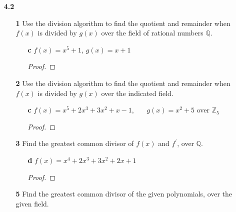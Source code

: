 \documentclass[paper=usletter, fontsize=12pt]{article}
\begin{document}

    \begin{enumerate}

        \item[\textbf{4.2}]
        \begin{enumerate}

            \item[\textbf{1}] Use the division algorithm to find the quotient
            and remainder when $f(x)$ is divided by $g(x)$ over the field of
            rational numbers $\mathbb{Q}$.
            \begin{enumerate}

                \item[\textbf{c}] $f(x) = x^5+1$,  $g(x) = x+1$
                \begin{proof}
                \end{proof}

            \end{enumerate}

            \item[\textbf{2}] Use the division algorithm to find the quotient
            and remainder when $f(x)$ is divided by $g(x)$ over the indicated
            field.
            \begin{enumerate}

                \item[\textbf{c}] $f(x) = x^5+2x^3+3x^2+x-1$, \ \ \ $g(x) =
                x^2+5$ over $\mathbb{Z}_5$
                \begin{proof}
                \end{proof}

            \end{enumerate}

            \item[\textbf{3}] Find the greatest common divisor of $f(x)$ and
            $f^\prime$, over $\mathbb{Q}$.
            \begin{enumerate}

                \item[\textbf{d}] $f(x) = x^4+2x^3+3x^2+2x+1$
                \begin{proof}
                \end{proof}

            \end{enumerate}

            \item[\textbf{5}] Find the greatest common divisor of the given
            polynomials, over the given field.
            \begin{enumerate}


\end{enumerate}
\end{enumerate}
\end{enumerate}
\end{document}
